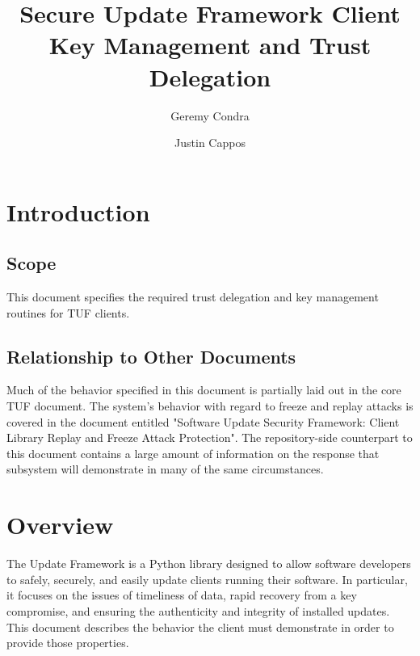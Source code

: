 \documentclass{letter}
\begin{document}
\title{Secure Update Framework Client Key Management and Trust Delegation}
\author{Geremy Condra \and Justin Cappos}
\maketitle


\section{Introduction}
\subsection{Scope}
This document specifies the required trust delegation and key management routines
for TUF clients.
\subsection{Relationship to Other Documents}
Much of the behavior specified in this document is partially laid out in the
core TUF document. The system's behavior with regard to freeze and replay
attacks is covered in the document entitled "Software Update Security Framework: 
Client Library Replay and Freeze Attack Protection". The repository-side counterpart
to this document contains a large amount of information on the response that
subsystem will demonstrate in many of the same circumstances. 

\section{Overview}
The Update Framework is a Python library designed to allow software developers to safely,
securely, and easily update clients running their software. In particular, it
focuses on the issues of timeliness of data, rapid recovery from a key compromise,
and ensuring the authenticity and integrity of installed updates. This document
describes the behavior the client must demonstrate in order to provide those
properties.
\end{document}
